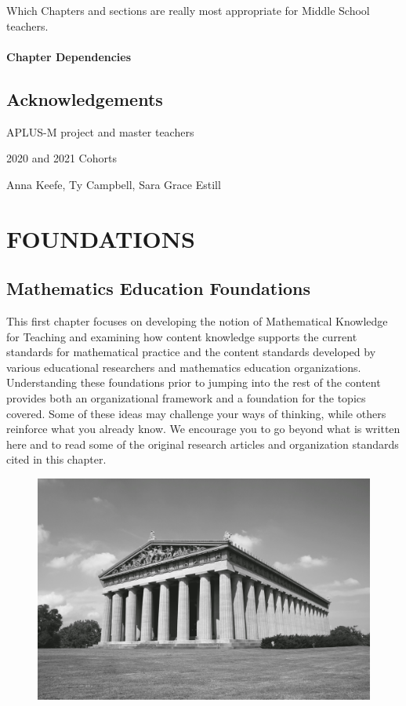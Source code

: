 \documentclass[
]{book}
\theoremstyle{definition}
\theoremstyle{definition}
\theoremstyle{definition}
\theoremstyle{definition}
\theoremstyle{remark}
\begin{document}
Which Chapters and sections are really most appropriate for Middle School teachers.

\hypertarget{chapter-dependencies}{%
\subsection*{Chapter Dependencies}\label{chapter-dependencies}}

\hypertarget{acknowledgements}{%
\chapter*{Acknowledgements}\label{acknowledgements}}

APLUS-M project and master teachers

2020 and 2021 Cohorts

Anna Keefe, Ty Campbell, Sara Grace Estill

\hypertarget{part-foundations}{%
\part{FOUNDATIONS}\label{part-foundations}}

\hypertarget{MathEdFoundations}{%
\chapter{Mathematics Education Foundations}\label{MathEdFoundations}}

This first chapter focuses on developing the notion of Mathematical Knowledge for Teaching and examining how content knowledge supports the current standards for mathematical practice and the content standards developed by various educational researchers and mathematics education organizations. Understanding these foundations prior to jumping into the rest of the content provides both an organizational framework and a foundation for the topics covered. Some of these ideas may challenge your ways of thinking, while others reinforce what you already know. We encourage you to go beyond what is written here and to read some of the original research articles and organization standards cited in this chapter.

\begin{figure}

{\centering \includegraphics[width=0.7\linewidth]{images/Parthenon_Nashville_bw} 

}

\end{figure}
\end{document}
